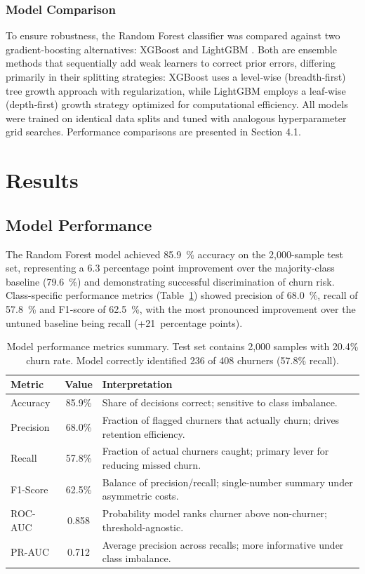 \documentclass[12pt]{article}
\begin{document}
\subsubsection{Model Comparison}
To ensure robustness, the Random Forest classifier was compared against two gradient‑boosting alternatives: XGBoost \citep{Chen_2016} and LightGBM \citep{ke2017lightgbm}.  Both are ensemble methods that sequentially add weak learners to correct prior errors, differing primarily in their splitting strategies: XGBoost uses a level‑wise (breadth‑first) tree growth approach with regularization, while LightGBM employs a leaf‑wise (depth‑first) growth strategy optimized for computational efficiency.  All models were trained on identical data splits and tuned with analogous hyperparameter grid searches.  Performance comparisons are presented in Section 4.1.

\section{Results}
\subsection{Model Performance}
The Random Forest model achieved 85.9~\% accuracy on the 2,000-sample test set, representing a 6.3 percentage point improvement over the majority-class baseline (79.6~\%) and demonstrating successful discrimination of churn risk. Class-specific performance metrics (Table~\ref{tab:model_performance}) showed precision of 68.0~\%, recall of 57.8~\% and F1‑score of 62.5~\%, with the most pronounced improvement over the untuned baseline being recall (+21~percentage points).

\begin{table}[H]
\centering
\small
\caption{Model performance metrics summary. Test set contains 2,000 samples with 20.4\% churn rate. Model correctly identified 236 of 408 churners (57.8\% recall).}
\label{tab:model_performance}
\begin{tabular}{lcp{9.5cm}}
\toprule
\textbf{Metric} & \textbf{Value} & \textbf{Interpretation} \\
\midrule
Accuracy & 85.9\% & Share of decisions correct; sensitive to class imbalance. \\
\cmidrule(lr){1-3}
Precision & 68.0\% & Fraction of flagged churners that actually churn; drives retention efficiency. \\
\cmidrule(lr){1-3}
Recall & 57.8\% & Fraction of actual churners caught; primary lever for reducing missed churn. \\
\cmidrule(lr){1-3}
F1-Score & 62.5\% & Balance of precision/recall; single-number summary under asymmetric costs. \\
\cmidrule(lr){1-3}
ROC-AUC & 0.858 & Probability model ranks churner above non-churner; threshold-agnostic. \\
\cmidrule(lr){1-3}
PR-AUC & 0.712 & Average precision across recalls; more informative under class imbalance. \\
\bottomrule
\end{tabular}
\end{table}
\end{document}
